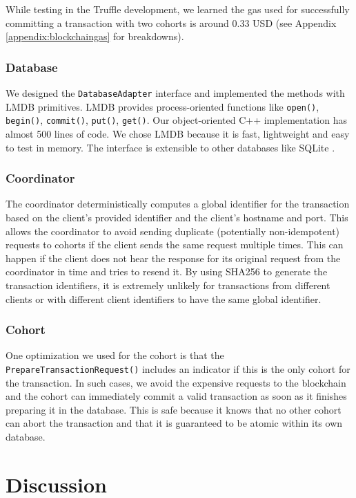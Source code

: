 \documentclass[11pt,sigplan,screen,nonacm]{acmart}
\begin{document}
While testing in the Truffle development, we learned the gas used for successfully committing a transaction with two cohorts is around 0.33 USD \cite{gwei} (see Appendix \ref{appendix:blockchaingas} for breakdowns).

\subsubsection{Database}
We designed the \texttt{DatabaseAdapter} interface and implemented the methods with LMDB primitives. LMDB provides process-oriented functions like \texttt{open()}, \texttt{begin()}, \texttt{commit()}, \texttt{put()}, \texttt{get()}. Our object-oriented C++ implementation has almost 500 lines of code. We chose LMDB because it is fast, lightweight and easy to test in memory. The interface is extensible to other databases like SQLite \cite{bhosale2015sqlite}.

\subsubsection{Coordinator}
The coordinator deterministically computes a global identifier for the transaction based on the client’s provided identifier and the client’s hostname and port. This allows the coordinator to avoid sending duplicate (potentially non-idempotent) requests to cohorts if the client sends the same request multiple times. This can happen if the client does not hear the response for its original request from the coordinator in time and tries to resend it. By using SHA256 to generate the transaction identifiers, it is extremely unlikely for transactions from different clients or with different client identifiers to have the same global identifier.

\subsubsection{Cohort}
One optimization we used for the cohort is that the \texttt{PrepareTransactionRequest()} includes an indicator if this is the only cohort for the transaction. In such cases, we avoid the expensive requests to the blockchain and the cohort can immediately commit a valid transaction as soon as it finishes preparing it in the database. This is safe because it knows that no other cohort can abort the transaction and that it is guaranteed to be atomic within its own database.

\section{Discussion}
\end{document}
